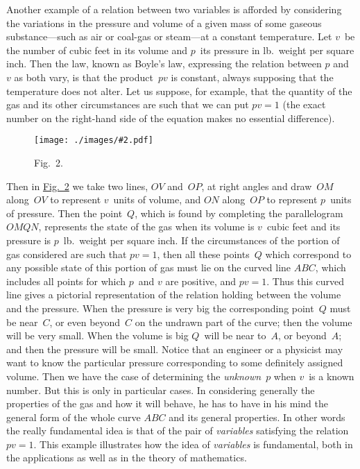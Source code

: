 \documentclass[12pt,leqno]{book}[2005/09/16]
\newcommand{\Graphic}[2]{%
  \phantomsection\label{fig:#2}%
  \texttt{[image: ./images/\#2.pdf]}%
}
\newcommand{\DefWidth}{4in}%
\newcommand{\Figure}[2][\DefWidth]{%
  \begin{figure}[hbt!]
    \centering
    \phantomsection\label{fig:#2}
    \Graphic{#1}{fig#2}
    \caption{Fig.~#2.}
  \end{figure}\ignorespaces%
}
\newcommand{\Fig}[2][Fig.]{\hyperref[fig:#2]{#1~#2}}
\newcommand{\PageSep}[1]{\ignorespaces}
\begin{document}
Another example of a relation between two
variables is afforded by considering the variations
in the pressure and volume of a given
mass of some gaseous substance---such as air
\PageSep{22}
or coal-gas or steam---at a constant temperature.
Let $v$~be the number of cubic feet in
its volume and $p$~its pressure in lb.\ weight
per square inch. Then the law, known as
Boyle's law, expressing the relation between
$p$ and~$v$ as both vary, is that the product~$pv$
is constant, always supposing that the
temperature does not alter. Let us suppose,
for example, that the quantity of the gas
and its other circumstances are such that
we can put $pv = 1$ (the exact number on
the right-hand side of the equation makes
no essential difference).
\Figure{2}

Then in \Fig{2} we take two lines, $OV$ and~$OP$,
at right angles and draw~$OM$ along~$OV$
to represent $v$~units of volume, and $ON$ along~$OP$
\PageSep{23}
to represent $p$~units of pressure. Then
the point~$Q$, which is found by completing the
parallelogram $OMQN$, represents the state of
the gas when its volume is $v$~cubic feet and its
pressure is $p$~lb.\ weight per square inch. If
the circumstances of the portion of gas considered
are such that $pv = 1$, then all these
points~$Q$ which correspond to any possible
state of this portion of gas must lie on the
curved line $ABC$, which includes all points
for which $p$~and $v$ are positive, and $pv = 1$.
Thus this curved line gives a pictorial representation
of the relation holding between the
volume and the pressure. When the pressure
is very big the corresponding point~$Q$ must
be near~$C$, or even beyond~$C$ on the undrawn
part of the curve; then the volume will be
very small. When the volume is big $Q$~will
be near to~$A$, or beyond~$A$; and then the
pressure will be small. Notice that an engineer
or a physicist may want to know the
particular pressure corresponding to some
definitely assigned volume. Then we have
the case of determining the \emph{unknown}~$p$ when
%
$v$~is a known number. But this is only in
particular cases. In considering generally
the properties of the gas and how it will behave,
he has to have in his mind the general
form of the whole curve $ABC$ and its general
properties. In other words the really fundamental
idea is that of the pair of \emph{variables}
\PageSep{24}
satisfying the relation $pv = 1$. This example
illustrates how the idea of \emph{variables} is fundamental,
%
both in the applications as well as in
the theory of mathematics.
\PageSep{25}
\end{document}
